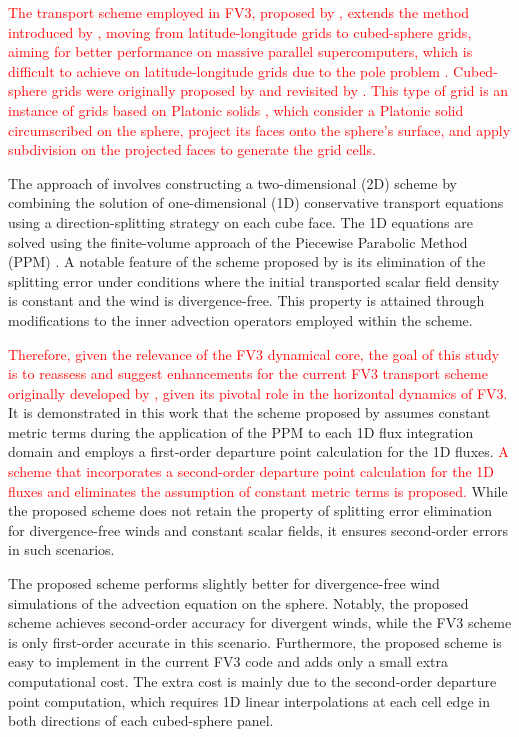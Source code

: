 \documentclass[preprint,12pt]{elsarticle}
\begin{document}
\begin{linenumbers}
\textcolor{red}{
The transport scheme employed in FV3, proposed by \cite{putman:2007}, extends the method introduced by \cite{lin:1996}, moving from latitude-longitude grids to cubed-sphere grids, aiming for better performance on massive parallel supercomputers, which is difficult to achieve on latitude-longitude grids due to the pole problem \cite{will:2007,stan:2012}.
Cubed-sphere grids were originally proposed by \cite{sadourny:1972} and revisited by \cite{rancic:1996,ronchi:1996}. 
This type of grid is an instance of grids based on Platonic solids \cite{stan:2012}, which consider a Platonic solid circumscribed on the sphere, project its faces onto the sphere's surface, and apply subdivision on the projected faces to generate the grid cells.
}

The approach of \cite{lin:1996,putman:2007} involves constructing a two-dimensional (2D) scheme by combining the solution of one-dimensional (1D) conservative transport equations using a direction-splitting strategy on each cube face.
The 1D equations are solved using the finite-volume approach of the Piecewise Parabolic Method (PPM) \cite{colella:1984,carpenter:1990}. 
A notable feature of the scheme proposed by \cite{lin:1996} is its elimination of the splitting error under conditions where the initial transported scalar field density is constant and the wind is divergence-free. 
This property is attained through modifications to the inner advection operators employed within the scheme. 

\textcolor{red}{
Therefore, given the relevance of the FV3 dynamical core,
the goal of this study is to reassess and suggest enhancements for the current FV3 transport scheme originally developed by \cite{putman:2007}, given its pivotal role in the horizontal dynamics of FV3.}
It is demonstrated in this work that the scheme proposed by \cite{putman:2007} assumes constant metric terms during the application of the PPM to each 1D flux integration domain and employs a first-order departure point calculation for the 1D fluxes.
\textcolor{red}{
A scheme that incorporates a second-order departure point calculation for the 1D fluxes and eliminates the assumption of constant metric terms is proposed.}
While the proposed scheme does not retain the property of splitting error elimination for divergence-free winds and constant scalar fields, it ensures second-order errors in such scenarios.

The proposed scheme performs slightly better for divergence-free wind simulations of the advection equation on the sphere.
Notably, the proposed scheme achieves second-order accuracy for divergent winds, while the FV3 scheme is only first-order accurate in this scenario.
Furthermore,  the proposed scheme is easy to implement in the current FV3 code and adds only a small extra computational cost.
The extra cost is mainly due to the second-order departure point computation, which requires 1D linear interpolations at each cell edge in both directions of each cubed-sphere panel.



\end{linenumbers}
\end{document}
